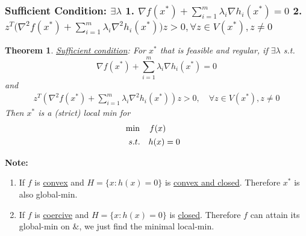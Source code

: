 \documentclass[11pt,a4paper]{article}
\newtheorem{theorem}{Theorem}
\begin{document}
\subsubsection{Sufficient Condition: $\exists\lambda$ 1. $\nabla f(x^*)+\sum_{i=1}^m\lambda_i \nabla h_i(x^*)=0$ 2. $z^T\big(\nabla^2 f(x^*)+\sum_{i=1}^m\lambda_i \nabla^2 h_i(x^*)\big)z> 0,\forall z\in V(x^*),z\neq 0$}
\begin{theorem}
    \underline{Sufficient condition}: For $x^*$ that is feasible and regular, if $\exists \lambda$ s.t.
    \begin{equation}
        \nabla f(x^*)+\sum_{i=1}^m\lambda_i \nabla h_i(x^*)=0
        \nonumber
    \end{equation}
    and
    \begin{equation}
        \begin{aligned}
            z^T\left(\nabla^2 f(x^*)+\sum_{i=1}^m\lambda_i \nabla^2 h_i(x^*)\right)z> 0,\quad \forall z\in V(x^*),z\neq 0
        \end{aligned}
        \nonumber
    \end{equation}
    Then $x^*$ is a (strict) local min for \begin{align*}
        &\min\quad f(x)\\
        &\begin{array}{r@{\quad}r@{}l@{\quad}l}
        s.t.
        &h(x)=0&\\
    \end{array}
    \end{align*}
\end{theorem}
\textbf{Note:}
\begin{enumerate}[(1)]
    \item If $f$ is \underline{convex} and $H=\{x:h(x)=0\}$ is \underline{convex and closed}. Therefore $x^*$ is also global-min.
    \item If $f$ is \underline{coercive} and $H=\{x:h(x)=0\}$ is \underline{closed}. Therefore $f$ can attain its global-min on $\&$, we just find the minimal local-min.
\end{enumerate}
\end{document}
